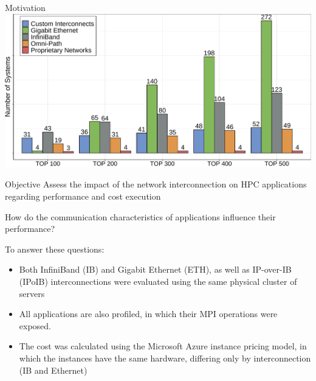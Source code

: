 \documentclass{beamer}
\begin{document}
\begin{frame}{Motivation}
        \framebreak
\includegraphics[width=\textwidth]{SLIDES/img/TOP500-5.pdf}

\end{frame}


\begin{frame}{Objective}
\vfill
Assess the impact of the \alert{network interconnection} on HPC applications regarding performance and cost execution

\pause \vfill
How do the \alert{communication characteristics} of applications influence their performance?

\pause \vfill
To answer these questions:

\pause \vfill
\begin{itemize}
    \item  Both \alert{InfiniBand (IB)} and \alert{Gigabit Ethernet (ETH)}, as well as \alert{IP-over-IB (IPoIB)} interconnections were evaluated using the same physical cluster of servers
\pause \vfill
    \item All applications are also profiled, in which their MPI operations were exposed.
\pause \vfill
    \item The cost was calculated using the Microsoft Azure instance pricing model, in which the instances have the same hardware, differing only by interconnection (IB and Ethernet)
\end{itemize}
\vfill
\end{frame}
\end{document}
